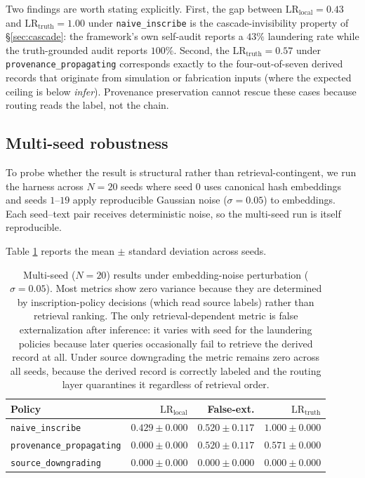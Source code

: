 \documentclass[11pt]{article}
\begin{document}
Two findings are worth stating explicitly. First, the gap between $\mathrm{LR}_{\text{local}} = 0.43$ and $\mathrm{LR}_{\text{truth}} = 1.00$ under \texttt{naive\_inscribe} is the cascade-invisibility property of \S\ref{sec:cascade}: the framework's own self-audit reports a $43\%$ laundering rate while the truth-grounded audit reports $100\%$. Second, the $\mathrm{LR}_{\text{truth}} = 0.57$ under \texttt{provenance\_propagating} corresponds exactly to the four-out-of-seven derived records that originate from simulation or fabrication inputs (where the expected ceiling is below \emph{infer}). Provenance preservation cannot rescue these cases because routing reads the label, not the chain.

\subsection{Multi-seed robustness}

To probe whether the result is structural rather than retrieval-contingent, we run the harness across $N=20$ seeds where seed $0$ uses canonical hash embeddings and seeds $1$--$19$ apply reproducible Gaussian noise ($\sigma = 0.05$) to embeddings. Each seed--text pair receives deterministic noise, so the multi-seed run is itself reproducible.

Table \ref{tab:multi-seed} reports the mean $\pm$ standard deviation across seeds.

\begin{table}[ht]
\centering
\begin{tabular}{lrrr}
\toprule
Policy & $\mathrm{LR}_{\text{local}}$ & False-ext. & $\mathrm{LR}_{\text{truth}}$ \\
\midrule
\texttt{naive\_inscribe}         & $0.429 \pm 0.000$ & $0.520 \pm 0.117$ & $1.000 \pm 0.000$ \\
\texttt{provenance\_propagating} & $0.000 \pm 0.000$ & $0.520 \pm 0.117$ & $0.571 \pm 0.000$ \\
\texttt{source\_downgrading}     & $0.000 \pm 0.000$ & $0.000 \pm 0.000$ & $0.000 \pm 0.000$ \\
\bottomrule
\end{tabular}
\caption{Multi-seed ($N=20$) results under embedding-noise perturbation ($\sigma=0.05$). Most metrics show zero variance because they are determined by inscription-policy decisions (which read source labels) rather than retrieval ranking. The only retrieval-dependent metric is false externalization after inference: it varies with seed for the laundering policies because later queries occasionally fail to retrieve the derived record at all. Under source downgrading the metric remains zero across all seeds, because the derived record is correctly labeled and the routing layer quarantines it regardless of retrieval order.}
\label{tab:multi-seed}
\end{table}
\end{document}
